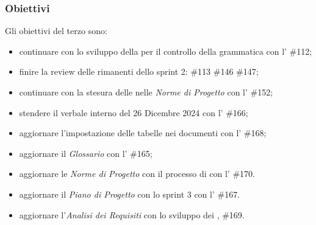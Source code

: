 \subsubsection{Obiettivi}
Gli obiettivi del terzo  sono:
\begin{itemize}
    \item continuare con lo sviluppo della  per il controllo della grammatica con l' \#112;
    \item finire la review delle  rimanenti dello sprint 2: \#113 \#146 \#147;
    \item continuare con la stesura delle  nelle \textit{Norme di Progetto} con l' \#152;
    \item stendere il verbale interno del 26 Dicembre 2024 con l' \#166;
    \item aggiornare l'impostazione delle tabelle nei documenti con l' \#168;
    \item aggiornare il \textit{Glossario} con l' \#165;
    \item aggiornare le \textit{Norme di Progetto} con il processo di  con l' \#170.
    \item aggiornare il \textit{Piano di Progetto} con lo sprint 3 con l' \#167.
    \item aggiornare l'\textit{Analisi dei Requisiti} con lo sviluppo dei ,  \#169.
\end{itemize}